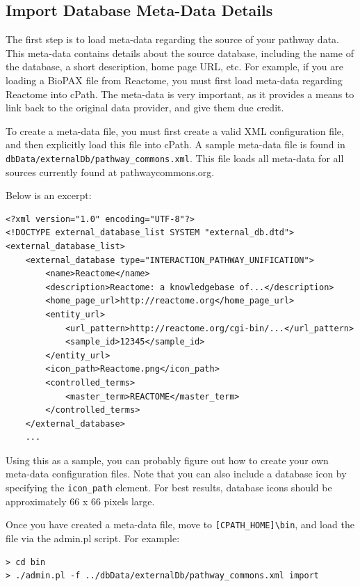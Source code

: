\documentclass[letterpaper,12pt]{article}
\begin{document}
\subsection{Import Database Meta-Data Details}

The first step is to load meta-data regarding the source of your pathway data.  This meta-data contains details about the source database, including the name of the database, a short description, home page URL, etc.  For example, if you are loading a BioPAX file from Reactome, you must first load meta-data regarding Reactome into cPath.  The meta-data is very important, as it provides a means to link back to the original data provider, and give them due credit.

To create a meta-data file, you must first create a valid XML configuration file, and then explicitly load this file into cPath.  A sample meta-data file is found in \verb+dbData/externalDb/pathway_commons.xml+.  This file loads all meta-data for all sources currently found at pathwaycommons.org.

Below is an excerpt:

\begin{verbatim}
<?xml version="1.0" encoding="UTF-8"?>
<!DOCTYPE external_database_list SYSTEM "external_db.dtd">
<external_database_list>
    <external_database type="INTERACTION_PATHWAY_UNIFICATION">
        <name>Reactome</name>
        <description>Reactome: a knowledgebase of...</description>
        <home_page_url>http://reactome.org</home_page_url>
        <entity_url>
            <url_pattern>http://reactome.org/cgi-bin/...</url_pattern>
            <sample_id>12345</sample_id>
        </entity_url>
        <icon_path>Reactome.png</icon_path>
        <controlled_terms>
            <master_term>REACTOME</master_term>
        </controlled_terms>
    </external_database>
    ...
\end{verbatim}

Using this as a sample, you can probably figure out how to create your own meta-data configuration files.  Note that you can also include a database icon by specifying the \verb+icon_path+ element.  For best results, database icons should be approximately 66 x 66 pixels large.

Once you have created a meta-data file, move to \verb+[CPATH_HOME]\bin+, and load the file via the admin.pl script.  For example:

\begin{verbatim}
> cd bin
> ./admin.pl -f ../dbData/externalDb/pathway_commons.xml import
\end{verbatim}
\end{document}

